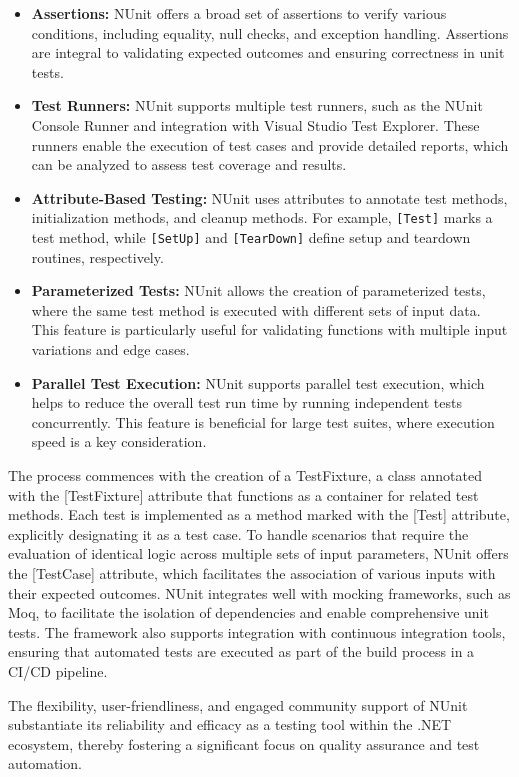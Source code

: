 \begin{itemize}
    \item \textbf{Assertions:} NUnit offers a broad set of assertions to verify various conditions, including equality, null checks, and exception handling. Assertions are integral to validating expected outcomes and ensuring correctness in unit tests.
    \item \textbf{Test Runners:} NUnit supports multiple test runners, such as the NUnit Console Runner and integration with Visual Studio Test Explorer. These runners enable the execution of test cases and provide detailed reports, which can be analyzed to assess test coverage and results.
    \item \textbf{Attribute-Based Testing:} NUnit uses attributes to annotate test methods, initialization methods, and cleanup methods. For example, \texttt{[Test]} marks a test method, while \texttt{[SetUp]} and \texttt{[TearDown]} define setup and teardown routines, respectively.
    \item \textbf{Parameterized Tests:} NUnit allows the creation of parameterized tests, where the same test method is executed with different sets of input data. This feature is particularly useful for validating functions with multiple input variations and edge cases.
    \item \textbf{Parallel Test Execution:} NUnit supports parallel test execution, which helps to reduce the overall test run time by running independent tests concurrently. This feature is beneficial for large test suites, where execution speed is a key consideration.
\end{itemize}
The process commences with the creation of a TestFixture, a class annotated with the [TestFixture] attribute that functions as a container for related test methods. Each test is implemented as a method marked with the [Test] attribute, explicitly designating it as a test case. To handle scenarios that require the evaluation of identical logic across multiple sets of input parameters, NUnit offers the [TestCase] attribute, which facilitates the association of various inputs with their expected outcomes.
NUnit integrates well with mocking frameworks, such as Moq, to facilitate the isolation of dependencies and enable comprehensive unit tests. The framework also supports integration with continuous integration tools, ensuring that automated tests are executed as part of the build process in a \ac{CI/CD} pipeline.

The flexibility, user-friendliness, and engaged community support of NUnit substantiate its reliability and efficacy as a testing tool within the .NET ecosystem, thereby fostering a significant focus on quality assurance and test automation.


